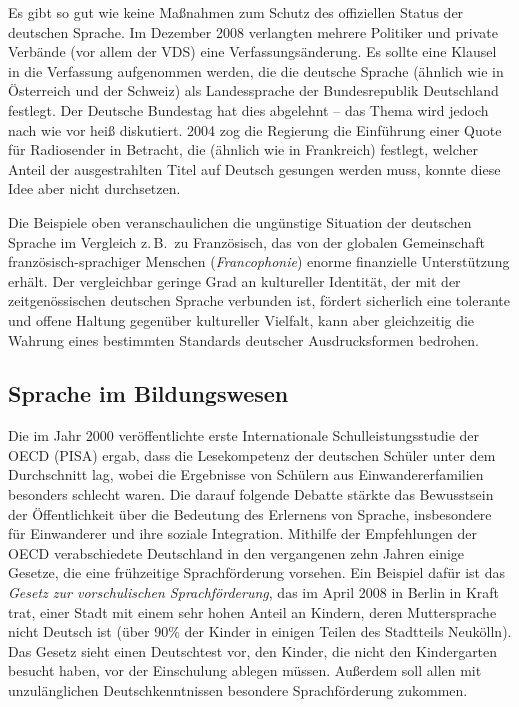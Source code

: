 \documentclass[]{../../metanetpaper}
\begin{document}
\begin{multicols}{2}

Es gibt so gut wie keine Maßnahmen zum Schutz des offiziellen Status der deutschen Sprache. Im Dezember 2008 verlangten mehrere Politiker und private Verbände (vor allem der VDS) eine Verfassungsänderung. Es sollte eine Klausel in die Verfassung aufgenommen werden, die die deutsche Sprache (ähnlich wie in Österreich und der Schweiz) als Landessprache der Bundesrepublik Deutschland festlegt. Der Deutsche Bundestag hat dies abgelehnt -- das Thema wird jedoch nach wie vor heiß diskutiert. 2004 zog die Regierung die Einführung einer Quote für Radiosender in Betracht, die (ähnlich wie in Frankreich) festlegt, welcher Anteil der ausgestrahlten Titel auf Deutsch gesungen werden muss, konnte diese Idee aber nicht durchsetzen.

Die Beispiele oben veranschaulichen die ungünstige Situation der deutschen Sprache im Vergleich z.\,B.~zu Französisch, das von der globalen Gemeinschaft fran\-zö\-sisch-sprachiger Menschen (\textit{Francophonie}) enorme finanzielle Unterstützung erhält. Der vergleichbar geringe Grad an kultureller Identität, der mit der zeitgenössischen deutschen Sprache verbunden ist, fördert sicherlich eine tolerante und offene Haltung gegenüber kultureller Vielfalt, kann aber gleichzeitig die Wahrung eines bestimmten Standards deutscher Ausdrucksformen bedrohen.

\subsection{Sprache im Bildungswesen}

Die im Jahr 2000 veröffentlichte erste Internationale Schulleistungsstudie der OECD (PISA) ergab, dass die Lesekompetenz der deutschen Schüler unter dem Durchschnitt lag, wobei die Ergebnisse von Schülern aus Einwandererfamilien besonders schlecht waren. Die darauf folgende Debatte stärkte das Bewusstsein der Öffentlichkeit über die Bedeutung des Erlernens von Sprache, insbesondere für Einwanderer und ihre soziale Integration. Mithilfe der Empfehlungen der OECD verabschiedete Deutschland in den vergangenen zehn Jahren einige Gesetze, die eine frühzeitige Sprachförderung vorsehen. Ein Beispiel dafür ist das \textit{Gesetz zur vorschulischen Sprachförderung}, das im April 2008 in Berlin in Kraft trat, einer Stadt mit einem sehr hohen Anteil an Kindern, deren Muttersprache nicht Deutsch ist (über 90\% der Kinder in einigen Teilen des Stadtteils Neukölln). Das Gesetz sieht einen Deutschtest vor, den Kinder, die nicht den Kindergarten besucht haben, vor der Einschulung ablegen müssen. Außerdem soll allen mit unzulänglichen Deutschkenntnissen besondere Sprachförderung zukommen.


\end{multicols}
\end{document}
